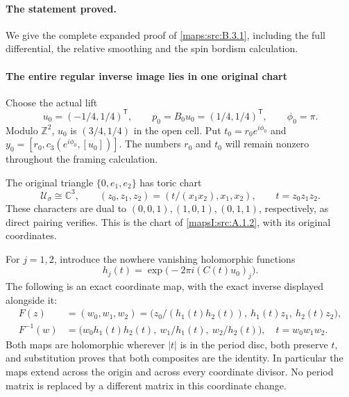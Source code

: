 \paragraph{The statement proved.} We give the complete expanded proof of \cref{maps:src:B.3.1}, including the full differential, the relative smoothing and the spin bordism calculation.


\paragraph{The entire regular inverse image lies in one original chart}

Choose the actual lift
\begin{equation}
 u_0=(-1/4,1/4)^{\mathsf T},\qquad
 p_0=B_0u_0=(1/4,1/4)^{\mathsf T},\qquad \phi_0=\pi.
 \label{wb:h24:ret:eq:chosen-value}
\end{equation}
Modulo \(\mathbb Z^2\), \(u_0\) is \((3/4,1/4)\) in the open cell.  Put
\(t_0=r_0e^{i\phi_0}\) and
\(y_0=[r_0,c_3(e^{i\phi_0},[u_0])]\).  The numbers \(r_0\) and
\(t_0\) will remain nonzero throughout the framing calculation.

The original triangle \(\{0,e_1,e_2\}\) has toric chart
\begin{equation}
 \mathcal U_\sigma\cong\mathbb C^3,\qquad
 (z_0,z_1,z_2)=(t/(x_1x_2),x_1,x_2),\qquad
 t=z_0z_1z_2.
 \label{wb:h24:ret:eq:z-chart}
\end{equation}
These characters are dual to \((0,0,1),(1,0,1),(0,1,1)\), respectively,
as direct pairing verifies.  This is the chart of
\cref{mapsI:src:A.1.2}, with its original coordinates.

For \(j=1,2\), introduce the nowhere vanishing holomorphic functions
\begin{equation}
 h_j(t)=\exp\bigl(-2\pi i(C(t)u_0)_j\bigr).
 \label{wb:h24:ret:eq:units}
\end{equation}
The following is an exact coordinate map, with the exact inverse
displayed alongside it:
\begin{align}
 F(z)&=(w_0,w_1,w_2)
 =\bigl(z_0/(h_1(t)h_2(t)),\ h_1(t)z_1,\ h_2(t)z_2\bigr),
 \label{wb:h24:ret:eq:F}\\
 F^{-1}(w)&=
 \bigl(w_0h_1(t)h_2(t),\ w_1/h_1(t),\ w_2/h_2(t)\bigr),
 \quad t=w_0w_1w_2.
 \label{wb:h24:ret:eq:Finv}
\end{align}
Both maps are holomorphic wherever \(|t|\) is in the period disc,
both preserve \(t\), and substitution proves that both composites are
the identity.  In particular the maps extend across the origin and
across every coordinate divisor.  No period matrix is replaced by a
different matrix in this coordinate change.

